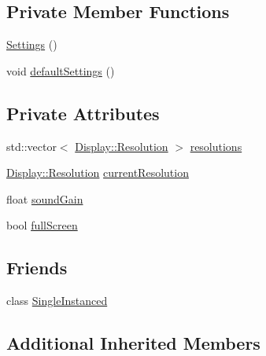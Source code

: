 \subsection*{Private Member Functions}
\begin{DoxyCompactItemize}
\item 
\hyperlink{classZeta_1_1Settings_a0c1b4df0d27eac87d81a073a5e5198a0}{Settings} ()
\item 
void \hyperlink{classZeta_1_1Settings_a816736b7d3226f4a79439cbe67e7fcb1}{default\+Settings} ()
\end{DoxyCompactItemize}
\subsection*{Private Attributes}
\begin{DoxyCompactItemize}
\item 
std\+::vector$<$ \hyperlink{classZeta_1_1Display_1_1Resolution}{Display\+::\+Resolution} $>$ \hyperlink{classZeta_1_1Settings_a4edd784ac3f38ad781dc214ad776e87e}{resolutions}
\item 
\hyperlink{classZeta_1_1Display_1_1Resolution}{Display\+::\+Resolution} \hyperlink{classZeta_1_1Settings_a48d7642ab9f41200a04b8fa87df6bd21}{current\+Resolution}
\item 
float \hyperlink{classZeta_1_1Settings_a32644610eb7d398eb5b679937bd270b3}{sound\+Gain}
\item 
bool \hyperlink{classZeta_1_1Settings_a9ab00f9bfa9b51a82e362109c7c98809}{full\+Screen}
\end{DoxyCompactItemize}
\subsection*{Friends}
\begin{DoxyCompactItemize}
\item 
class \hyperlink{classZeta_1_1Settings_a2fa95d69b32a77fffa4b730679a8b08c}{Single\+Instanced}
\end{DoxyCompactItemize}
\subsection*{Additional Inherited Members}


